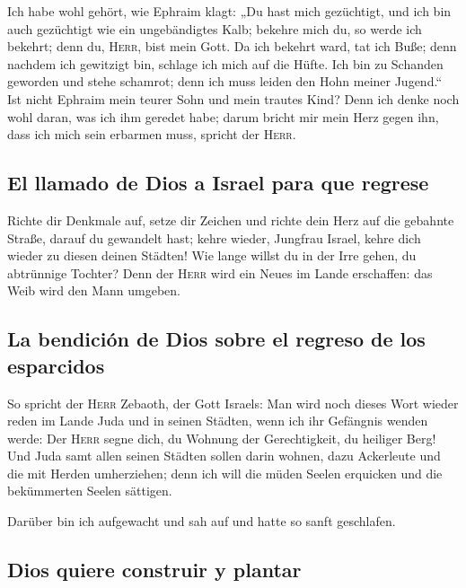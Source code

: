 Ich habe wohl gehört, wie Ephraim klagt: „Du hast mich
gezüchtigt, und ich bin auch gezüchtigt wie ein ungebändigtes Kalb;
bekehre mich du, so werde ich bekehrt; denn du, \textsc{Herr}, bist mein
Gott.  Da ich bekehrt ward, tat ich Buße; denn nachdem
ich gewitzigt bin, schlage ich mich auf die Hüfte. Ich bin zu Schanden
geworden und stehe schamrot; denn ich muss leiden den Hohn meiner
Jugend.``  Ist nicht Ephraim mein teurer Sohn und mein
trautes Kind? Denn ich denke noch wohl daran, was ich ihm geredet habe;
darum bricht mir mein Herz gegen ihn, dass ich mich sein erbarmen muss,
spricht der \textsc{Herr}.

\hypertarget{el-llamado-de-dios-a-israel-para-que-regrese}{%
\subsection{El llamado de Dios a Israel para que
regrese}\label{el-llamado-de-dios-a-israel-para-que-regrese}}

 Richte dir Denkmale auf, setze dir Zeichen und richte
dein Herz auf die gebahnte Straße, darauf du gewandelt hast; kehre
wieder, Jungfrau Israel, kehre dich wieder zu diesen deinen Städten!
 Wie lange willst du in der Irre gehen, du abtrünnige
Tochter? Denn der \textsc{Herr} wird ein Neues im Lande erschaffen: das
Weib wird den Mann umgeben.

\hypertarget{la-bendiciuxf3n-de-dios-sobre-el-regreso-de-los-esparcidos}{%
\subsection{La bendición de Dios sobre el regreso de los
esparcidos}\label{la-bendiciuxf3n-de-dios-sobre-el-regreso-de-los-esparcidos}}

 So spricht der \textsc{Herr} Zebaoth, der Gott Israels:
Man wird noch dieses Wort wieder reden im Lande Juda und in seinen
Städten, wenn ich ihr Gefängnis wenden werde: Der \textsc{Herr} segne
dich, du Wohnung der Gerechtigkeit, du heiliger Berg! 
Und Juda samt allen seinen Städten sollen darin wohnen, dazu Ackerleute
und die mit Herden umherziehen;  denn ich will die müden
Seelen erquicken und die bekümmerten Seelen sättigen.

 Darüber bin ich aufgewacht und sah auf und hatte so
sanft geschlafen.

\hypertarget{dios-quiere-construir-y-plantar}{%
\subsection{Dios quiere construir y
plantar}\label{dios-quiere-construir-y-plantar}}

